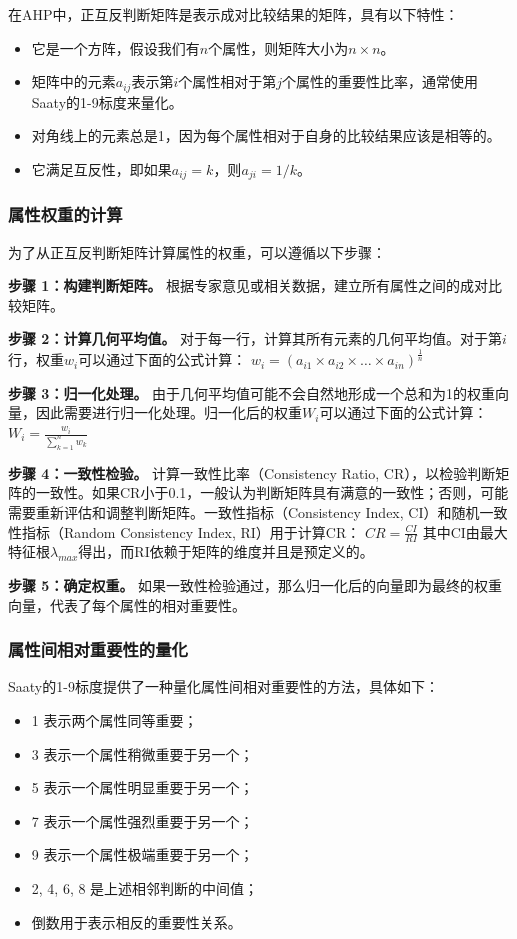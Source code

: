 \documentclass{article}
\begin{document}
在AHP中，正互反判断矩阵是表示成对比较结果的矩阵，具有以下特性：
\begin{itemize}
	\item 它是一个方阵，假设我们有$n$个属性，则矩阵大小为$n \times n$。
	\item 矩阵中的元素$a_{ij}$表示第$i$个属性相对于第$j$个属性的重要性比率，通常使用Saaty的1-9标度来量化。
	\item 对角线上的元素总是1，因为每个属性相对于自身的比较结果应该是相等的。
	\item 它满足互反性，即如果$a_{ij} = k$，则$a_{ji} = 1/k$。
\end{itemize}

\subsubsection{属性权重的计算}

为了从正互反判断矩阵计算属性的权重，可以遵循以下步骤：

\textbf{步骤 1：构建判断矩阵。}
根据专家意见或相关数据，建立所有属性之间的成对比较矩阵。

\textbf{步骤 2：计算几何平均值。}
对于每一行，计算其所有元素的几何平均值。对于第$i$行，权重$w_i$可以通过下面的公式计算：
$ w_i = \left( a_{i1} \times a_{i2} \times \dots \times a_{in} \right)^{\frac{1}{n}} $

\textbf{步骤 3：归一化处理。}
由于几何平均值可能不会自然地形成一个总和为1的权重向量，因此需要进行归一化处理。归一化后的权重$W_i$可以通过下面的公式计算：
$ W_i = \frac{w_i}{\sum_{k=1}^{n} w_k} $

\textbf{步骤 4：一致性检验。}
计算一致性比率（Consistency Ratio, CR），以检验判断矩阵的一致性。如果CR小于0.1，一般认为判断矩阵具有满意的一致性；否则，可能需要重新评估和调整判断矩阵。一致性指标（Consistency Index, CI）和随机一致性指标（Random Consistency Index, RI）用于计算CR：
$ CR = \frac{CI}{RI} $
其中CI由最大特征根$\lambda_{max}$得出，而RI依赖于矩阵的维度并且是预定义的。

\textbf{步骤 5：确定权重。}
如果一致性检验通过，那么归一化后的向量即为最终的权重向量，代表了每个属性的相对重要性。

\subsubsection{属性间相对重要性的量化}

Saaty的1-9标度提供了一种量化属性间相对重要性的方法，具体如下：
\begin{itemize}
	\item 1 表示两个属性同等重要；
	\item 3 表示一个属性稍微重要于另一个；
	\item 5 表示一个属性明显重要于另一个；
	\item 7 表示一个属性强烈重要于另一个；
	\item 9 表示一个属性极端重要于另一个；
	\item 2, 4, 6, 8 是上述相邻判断的中间值；
	\item 倒数用于表示相反的重要性关系。
\end{itemize}
\end{document}

